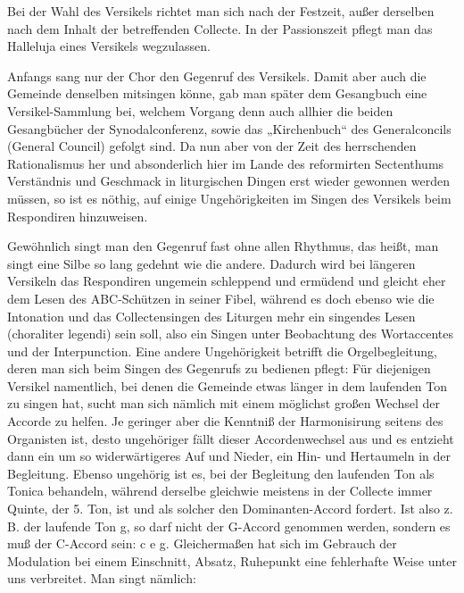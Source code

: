 Bei der Wahl des Versikels richtet man sich nach der Festzeit, außer derselben nach dem Inhalt der betreffenden Collecte. In der Passionszeit pflegt man das Halleluja eines Versikels wegzulassen.

Anfangs sang nur der Chor den Gegenruf des Versikels. Damit aber auch die Gemeinde denselben mitsingen könne, gab man später dem Gesangbuch eine Versikel-Sammlung bei, welchem Vorgang denn auch allhier die beiden Gesangbücher der Synodalconferenz, sowie das „Kirchenbuch“ des Generalconcils (General Council) gefolgt sind. Da nun aber von der Zeit des herrschenden Rationalismus her und absonderlich hier im Lande des reformirten Sectenthums Verständnis und Geschmack in liturgischen Dingen erst wieder gewonnen werden müssen, so ist es nöthig, auf einige Ungehörigkeiten im Singen des Versikels beim Respondiren hinzuweisen.

Gewöhnlich singt man den Gegenruf fast ohne allen Rhythmus, das heißt, man singt eine Silbe so lang gedehnt wie die andere. Dadurch wird bei längeren Versikeln das Respondiren ungemein schleppend und ermüdend und gleicht eher dem Lesen des ABC-Schützen in seiner Fibel, während es doch ebenso wie die Intonation und das Collectensingen des Liturgen mehr ein singendes Lesen (choraliter legendi) sein soll, also ein Singen unter Beobachtung des Wortaccentes und der Interpunction. Eine andere Ungehörigkeit betrifft die Orgelbegleitung, deren man sich beim Singen des Gegenrufs zu bedienen pflegt: Für diejenigen Versikel namentlich, bei denen die Gemeinde etwas länger in dem laufenden Ton zu singen hat, sucht man sich nämlich mit einem möglichst großen Wechsel der Accorde zu helfen. Je geringer aber die Kenntniß der Harmonisirung seitens des Organisten ist, desto ungehöriger fällt dieser Accordenwechsel aus und es entzieht dann ein um so widerwärtigeres
Auf und Nieder, ein Hin- und Hertaumeln in der Begleitung. Ebenso ungehörig ist es, bei der Begleitung den laufenden Ton als Tonica behandeln, während derselbe gleichwie meistens in der Collecte immer Quinte, der 5. Ton, ist und als solcher den Dominanten-Accord fordert. Ist also z. B. der laufende Ton g, so darf nicht der G-Accord genommen werden, sondern es muß der C-Accord sein: c e g. Gleichermaßen hat sich im Gebrauch der Modulation bei einem Einschnitt, Absatz, Ruhepunkt eine fehlerhafte Weise unter uns verbreitet. Man singt nämlich:


